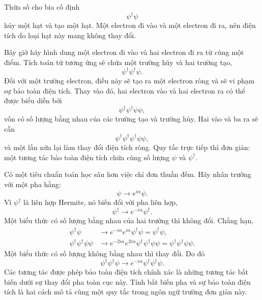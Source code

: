 Thừa số cho bia cố định
\begin{equation}
\psi^\dagger\psi
\end{equation}
hủy một hạt và tạo một hạt. Một electron đi vào và một electron đi ra, nên điện tích do loại hạt này mang không thay đổi.

Bây giờ hãy hình dung một electron đi vào và hai electron đi ra từ cùng một điểm. Tích toán tử tương ứng sẽ chứa một trường hủy và hai trường tạo,
\begin{equation}
\psi^\dagger\psi^\dagger\psi.
\end{equation}
Đối với một trường electron, điều này sẽ tạo ra một electron ròng và sẽ vi phạm sự bảo toàn điện tích. Thay vào đó, hai electron vào và hai electron ra có thể được biểu diễn bởi
\begin{equation}
\psi^\dagger\psi^\dagger\psi\psi,
\end{equation}
vốn có số lượng bằng nhau của các trường tạo và trường hủy. Hai vào và ba ra sẽ cần
\begin{equation}
\psi^\dagger\psi^\dagger\psi^\dagger\psi\psi,
\end{equation}
và một lần nữa lại làm thay đổi điện tích ròng. Quy tắc trực tiếp thì đơn giản: một tương tác bảo toàn điện tích chứa cùng số lượng \(\psi\) và \(\psi^\dagger\).

\begin{classroomqa}
\end{classroomqa}

Có một tiêu chuẩn toán học sâu hơn việc chỉ đơn thuần đếm. Hãy nhân trường với một pha hằng:
\begin{equation}
\psi\longrightarrow e^{i\alpha}\psi.
\end{equation}
Vì \(\psi^\dagger\) là liên hợp Hermite, nó biến đổi với pha liên hợp,
\begin{equation}
\psi^\dagger\longrightarrow e^{-i\alpha}\psi^\dagger.
\end{equation}
Một biểu thức có số lượng bằng nhau của hai trường thì không đổi. Chẳng hạn,
\begin{align}
\psi^\dagger\psi
&\longrightarrow
e^{-i\alpha}e^{i\alpha}\psi^\dagger\psi
=\psi^\dagger\psi,\\
\psi^\dagger\psi^\dagger\psi\psi
&\longrightarrow
e^{-2i\alpha}e^{2i\alpha}
\psi^\dagger\psi^\dagger\psi\psi
=\psi^\dagger\psi^\dagger\psi\psi.
\end{align}
Một biểu thức có số lượng không bằng nhau thì thay đổi. Do đó
\begin{equation}
\psi^\dagger\psi^\dagger\psi
\longrightarrow
e^{-i\alpha}\psi^\dagger\psi^\dagger\psi.
\end{equation}
Các tương tác được phép bảo toàn điện tích chính xác là những tương tác bất biến dưới sự thay đổi pha toàn cục này. Tính bất biến pha và sự bảo toàn điện tích là hai cách mô tả cùng một quy tắc trong ngôn ngữ trường đơn giản này.

